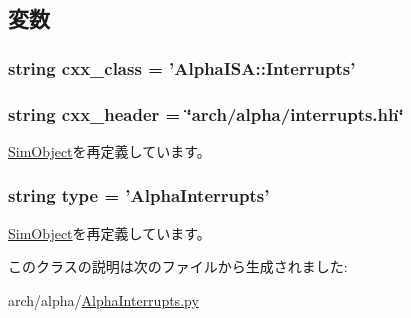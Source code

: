 \subsection{変数}
\hypertarget{classAlphaInterrupts_1_1AlphaInterrupts_a58cd55cd4023648e138237cfc0822ae3}{
\subsubsection[{cxx\_\-class}]{\setlength{\rightskip}{0pt plus 5cm}string {\bf cxx\_\-class} = '{\bf AlphaISA::Interrupts}'}}
\label{classAlphaInterrupts_1_1AlphaInterrupts_a58cd55cd4023648e138237cfc0822ae3}
\hypertarget{classAlphaInterrupts_1_1AlphaInterrupts_a17da7064bc5c518791f0c891eff05fda}{
\subsubsection[{cxx\_\-header}]{\setlength{\rightskip}{0pt plus 5cm}string {\bf cxx\_\-header} = \char`\"{}arch/alpha/interrupts.hh\char`\"{}}}
\label{classAlphaInterrupts_1_1AlphaInterrupts_a17da7064bc5c518791f0c891eff05fda}


\hyperlink{classm5_1_1SimObject_1_1SimObject_a17da7064bc5c518791f0c891eff05fda}{SimObject}を再定義しています。\hypertarget{classAlphaInterrupts_1_1AlphaInterrupts_acce15679d830831b0bbe8ebc2a60b2ca}{
\subsubsection[{type}]{\setlength{\rightskip}{0pt plus 5cm}string {\bf type} = '{\bf AlphaInterrupts}'}}
\label{classAlphaInterrupts_1_1AlphaInterrupts_acce15679d830831b0bbe8ebc2a60b2ca}


\hyperlink{classm5_1_1SimObject_1_1SimObject_acce15679d830831b0bbe8ebc2a60b2ca}{SimObject}を再定義しています。

このクラスの説明は次のファイルから生成されました:\begin{DoxyCompactItemize}
\item 
arch/alpha/\hyperlink{AlphaInterrupts_8py}{AlphaInterrupts.py}\end{DoxyCompactItemize}
